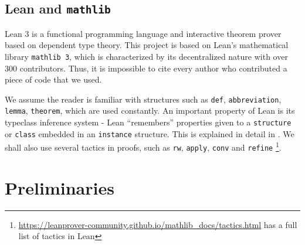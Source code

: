 \documentclass[a4paper,UKenglish,cleveref, autoref, thm-restate]{lipics-v2021}
\newcommand{\lean}[1]{\texttt{#1}\xspace} %
\begin{document}
\subsection{Lean and \lean{mathlib}}
Lean 3 is a functional programming language and interactive theorem prover based on
dependent type theory. This project is based on Lean’s 
mathematical library \lean{mathlib 3}, which is characterized by
its decentralized nature with over 300 contributors. Thus, it is impossible to cite every author who contributed a piece of code that we used.

We assume the reader is familiar with structures such as \lean{def}, \lean{abbreviation}, \lean{lemma}, \lean{theorem}, which are used constantly. 
An important property of Lean is its typeclass inference system - 
Lean ``remembers'' properties given to a \lean{structure} or \lean{class} embedded in an \lean{instance} structure. This is explained in detail in \cite{mathlib}. 
We shall also use several tactics in proofs, such as \lean{rw}, \lean{apply}, \lean{conv} and \lean{refine}
\footnote{\url{https://leanprover-community.github.io/mathlib_docs/tactics.html} has a full list of tactics in Lean}.
\section{Preliminaries}
\label{section2}
\end{document}
